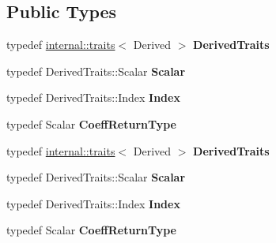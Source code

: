 \subsection*{Public Types}
\begin{DoxyCompactItemize}
\item 
\mbox{\label{class_eigen_1_1_tensor_base_a6f0d151640b15091fb1e24a437646b2e}} 
typedef \hyperlink{struct_eigen_1_1internal_1_1traits}{internal\+::traits}$<$ Derived $>$ {\bfseries Derived\+Traits}
\item 
\mbox{\label{class_eigen_1_1_tensor_base_a34e3dd205b751a9140eddeee4d1cad2b}} 
typedef Derived\+Traits\+::\+Scalar {\bfseries Scalar}
\item 
\mbox{\label{class_eigen_1_1_tensor_base_afed1f7db69449d2dab21c40424cf7bda}} 
typedef Derived\+Traits\+::\+Index {\bfseries Index}
\item 
\mbox{\label{class_eigen_1_1_tensor_base_a8671fba267e543ee1b927c395f23dfe2}} 
typedef Scalar {\bfseries Coeff\+Return\+Type}
\item 
\mbox{\label{class_eigen_1_1_tensor_base_a6f0d151640b15091fb1e24a437646b2e}} 
typedef \hyperlink{struct_eigen_1_1internal_1_1traits}{internal\+::traits}$<$ Derived $>$ {\bfseries Derived\+Traits}
\item 
\mbox{\label{class_eigen_1_1_tensor_base_a34e3dd205b751a9140eddeee4d1cad2b}} 
typedef Derived\+Traits\+::\+Scalar {\bfseries Scalar}
\item 
\mbox{\label{class_eigen_1_1_tensor_base_afed1f7db69449d2dab21c40424cf7bda}} 
typedef Derived\+Traits\+::\+Index {\bfseries Index}
\item 
\mbox{\label{class_eigen_1_1_tensor_base_a8671fba267e543ee1b927c395f23dfe2}} 
typedef Scalar {\bfseries Coeff\+Return\+Type}
\end{DoxyCompactItemize}
